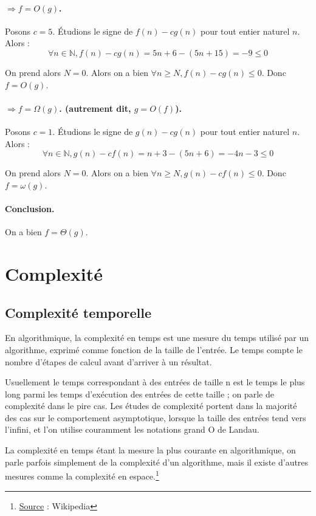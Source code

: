 \documentclass{article}
\newcommand{\plagiatWikipedia}{\footnote{\underline{Source} : Wikipedia}}
\begin{document}
    \paragraph{$ \Rightarrow f = O(g)$.}

    Posons $c = 5$. Étudions le signe de $f(n) - cg(n)$ pour tout entier naturel $n$. Alors :
    \[\forall n \in \mathbb{N}, f(n) - cg(n) = 5n + 6 - (5n + 15) = -9 \le 0\]

    On prend alors $N = 0$. Alors on a bien $\forall n \ge N, f(n) - cg(n) \le 0$. Donc $f = O(g)$.

    \paragraph{$ \Rightarrow f = \Omega(g)$. (autrement dit, $g = O(f)$).}

    Posons $c = 1$. Étudions le signe de $g(n) - cg(n)$ pour tout entier naturel $n$. Alors :
    \[\forall n \in \mathbb{N}, g(n) - cf(n) = n + 3 - (5n + 6) = -4n - 3 \le 0\]

    On prend alors $N = 0$. Alors on a bien $\forall n \ge N, g(n) - cf(n) \le 0$. Donc $f = \omega(g)$.

    \paragraph{Conclusion.} On a bien $f = \Theta(g)$.


    \section{Complexité}

    \subsection{Complexité temporelle}

    En algorithmique, la complexité en temps est une mesure du temps utilisé par un algorithme, exprimé comme fonction de la taille de l'entrée. Le temps compte le nombre d'étapes de calcul avant d'arriver à un résultat.

    Usuellement le temps correspondant à des entrées de taille n est le temps le plus long parmi les temps d’exécution des entrées de cette taille ; on parle de complexité dans le pire cas. Les études de complexité portent dans la majorité des cas sur le comportement asymptotique, lorsque la taille des entrées tend vers l'infini, et l'on utilise couramment les notations grand O de Landau.

    La complexité en temps étant la mesure la plus courante en algorithmique, on parle parfois simplement de la complexité d'un algorithme, mais il existe d'autres mesures comme la complexité en espace.\plagiatWikipedia 
\end{document}
